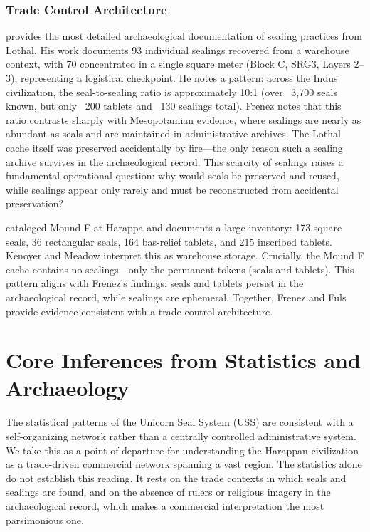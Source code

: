 \documentclass[12pt]{article}
\begin{document}
\subsubsection{Trade Control Architecture}

\citet{frenez2005lothal} provides the most detailed archaeological documentation of
sealing practices from Lothal. His work documents 93 individual sealings recovered
from a warehouse context, with 70 concentrated in a single square meter (Block C,
SRG3, Layers 2–3), representing a logistical checkpoint. He notes a pattern:
across the Indus civilization, the seal-to-sealing ratio is approximately 10:1
(over ~3,700 seals known, but only ~200 tablets and ~130 sealings total). Frenez notes
that this ratio contrasts sharply with Mesopotamian evidence, where sealings are
nearly as abundant as seals and are maintained in administrative archives. The Lothal
cache itself was preserved accidentally by fire---the only reason such a sealing archive
survives in the archaeological record. This scarcity of sealings raises a fundamental
operational question: why would seals be preserved and reused, while sealings appear
only rarely and must be reconstructed from accidental preservation?


\citet{fuls2023catalog} cataloged Mound F at Harappa and documents a large
inventory: 173 square seals, 36 rectangular seals, 164 bas-relief tablets, and
215 inscribed tablets. Kenoyer and Meadow interpret this as warehouse storage.
Crucially, the Mound F cache contains no sealings—only the permanent tokens
(seals and tablets). This pattern aligns with Frenez's findings: seals and
tablets persist in the archaeological record, while sealings are ephemeral.
Together, Frenez and Fuls provide evidence consistent with a trade control
architecture.


\section{Core Inferences from Statistics and Archaeology}
\label{sec:core_inferences}

The statistical patterns of the Unicorn Seal System (USS) are consistent with a
self-organizing network rather than a centrally controlled administrative
system. We take this as a point of departure for understanding the Harappan
civilization as a trade-driven commercial network spanning a vast region. The
statistics alone do not establish this reading. It rests on the trade contexts in
which seals and sealings are found, and on the absence of rulers or religious
imagery in the archaeological record, which makes a commercial interpretation the
most parsimonious one.
\end{document}
